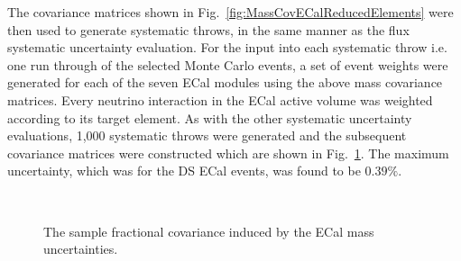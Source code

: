 \label{subsubsec:ECalMassSystematicPropagation}
The covariance matrices shown in Fig.~\ref{fig:MassCovECalReducedElements} were then used to generate systematic throws, in the same manner as the flux systematic uncertainty evaluation.  For the input into each systematic throw i.e. one run through of the selected Monte Carlo events, a set of event weights were generated for each of the seven ECal modules using the above mass covariance matrices.  Every neutrino interaction in the ECal active volume was weighted according to its target element.  As with the other systematic uncertainty evaluations, 1,000 systematic throws were generated and the subsequent covariance matrices were constructed which are shown in Fig.~\ref{fig:ECalMassCovarianceMatrices}.  The maximum uncertainty, which was for the DS ECal events, was found to be $0.39\%$. 
\begin{figure}%
  \centering
  \\
  \caption{The sample fractional covariance induced by the ECal mass uncertainties.}
  \label{fig:ECalMassCovarianceMatrices}
\end{figure}
